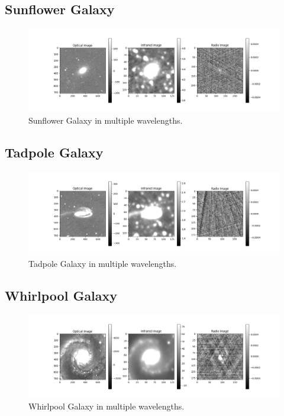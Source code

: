 \subsection{Sunflower Galaxy}

\begin{figure}[H]
    \centering
    \includegraphics[width=\textwidth]{Images/sunflower.png}
    \caption{Sunflower Galaxy in multiple wavelengths.}
    \label{fig:sunflower}
\end{figure}

\subsection{Tadpole Galaxy}
    
\begin{figure}[H]
    \centering
    \includegraphics[width=\textwidth]{Images/tadpole.png}
    \caption{Tadpole Galaxy in multiple wavelengths.}
    \label{fig:tadpole}
\end{figure}

\subsection{Whirlpool Galaxy}

\begin{figure}[H]
    \centering
    \includegraphics[width=\textwidth]{Images/whirlpool.png}
    \caption{Whirlpool Galaxy in multiple wavelengths.}
    \label{fig:whirlpool}
\end{figure}

